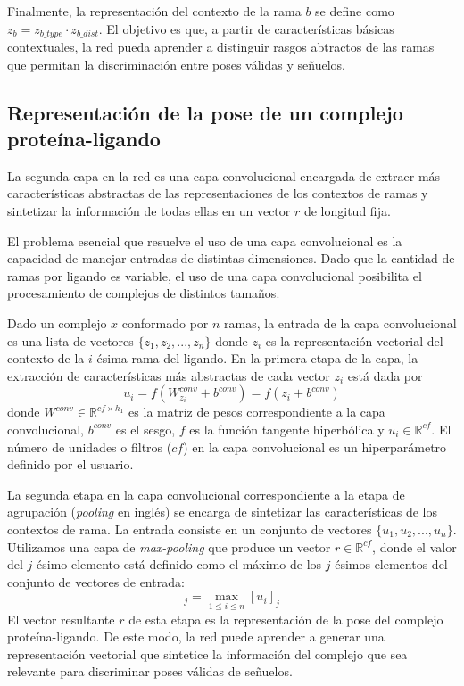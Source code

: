 Finalmente, la representación del contexto de la rama $b$ se define
como $z_b = z_{b\_type} \cdot z_{b\_dist}$. El objetivo es que, a
partir de características básicas contextuales, la red pueda aprender
a distinguir rasgos abtractos de las ramas que permitan la
discriminación entre poses válidas y señuelos.

\subsection{Representación de la pose de un complejo proteína-ligando}

La segunda capa en la red es una capa convolucional encargada de
extraer más características abstractas de las representaciones de los
contextos de ramas y sintetizar la información de todas ellas en un
vector $r$ de longitud fija.

El problema esencial que resuelve el uso de una capa convolucional es
la capacidad de manejar entradas de distintas dimensiones. Dado que la
cantidad de ramas por ligando es variable, el uso de una capa
convolucional posibilita el procesamiento de complejos de distintos
tamaños.

Dado un complejo $x$ conformado por $n$ ramas, la entrada de la capa
convolucional es una lista de vectores $\{z_1, z_2, ..., z_n\}$ donde
$z_i$ es la representación vectorial del contexto de la $i$-ésima rama
del ligando. En la primera etapa de la capa, la extracción de
características más abstractas de cada vector $z_i$ está dada por
\begin{equation}
  u_i = f(W^{conv}_{z_i} + b^{conv}) = f(z_i + b^{conv})
\end{equation}
donde $W^{conv} \in \mathbb{R}^{cf \times h_1}$ es la matriz de pesos
correspondiente a la capa convolucional, $b^{conv}$ es el sesgo, $f$
es la función tangente hiperbólica y $u_i \in \mathbb{R}^{cf}$. El
número de unidades o filtros ($cf$) en la capa convolucional es un
hiperparámetro definido por el usuario.

La segunda etapa en la capa convolucional correspondiente a la etapa
de agrupación (\textit{pooling} en inglés) se encarga de sintetizar
las características de los contextos de rama. La entrada consiste en
un conjunto de vectores $\{u_1, u_2, ..., u_n\}$. Utilizamos una capa
de \textit{max-pooling} que produce un vector $r \in \mathbb{R}^{cf}$,
donde el valor del $j$-ésimo elemento está definido como el máximo de
los $j$-ésimos elementos del conjunto de vectores de entrada:
\begin{equation}
  [r]_j = \max_{1 \leq i \leq n} [u_i]_j
\end{equation}
El vector resultante $r$ de esta etapa es la representación de la pose
del complejo proteína-ligando. De este modo, la red puede aprender a
generar una representación vectorial que sintetice la información del
complejo que sea relevante para discriminar poses válidas de señuelos.

